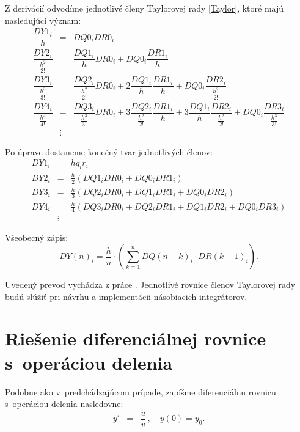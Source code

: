 Z derivácií odvodíme jednotlivé členy Taylorovej rady \eqref{Taylor}, ktoré majú nasledujúci význam:
\begin{eqnarray}
\dfrac{DY1_{i}}{h} & = & DQ0_i DR0_i \\
\dfrac{DY2_{i}}{\frac{h^{2}}{2!}} & = & \dfrac{DQ1_i}{h} DR0_i + DQ0_i \dfrac{DR1_i}{h} \nonumber \\
\dfrac{DY3_{i}}{\frac{h^{3}}{3!}} & = & \dfrac{DQ2_i}{\frac{h^{2}}{2!}} DR0_i + 2 \dfrac{DQ1_i}{h} \dfrac{DR1_i}{h} + DQ0_i \dfrac{DR2_i}{\frac{h^{2}}{2!}} \nonumber \\
\dfrac{DY4_{i}}{\frac{h^{4}}{4!}} & = & \dfrac{DQ3_i}{\frac{h^{3}}{3!}} DR0_i + 3 \dfrac{DQ2_i}{\frac{h^{2}}{2!}} \dfrac{DR1_i}{h} + 3 \dfrac{DQ1_i}{h} \dfrac{DR2_i}{\frac{h^{2}}{2!}} + DQ0_i \dfrac{DR3_i}{\frac{h^{3}}{3!}} \nonumber \\
& \vdots \nonumber & 
\end{eqnarray}



Po úprave dostaneme konečný tvar jednotlivých členov:
\begin{eqnarray}
DY1_{i} & = & hq_{i}r_{i} \label{DY1_cleny_nasobenia} \\
DY2_{i} & = & \frac{h}{2} (DQ1_{i}DR0_{i} + DQ0_{i}DR1_{i}) \label{DY2_cleny_nasobenia} \\
DY3_{i} & = & \frac{h}{3} (DQ2_{i}DR0_{i} + DQ1_{i}DR1_{i} + DQ0_{i}DR2_{i}) \label{DY3_cleny_nasobenia} \\
DY4_{i} & = & \frac{h}{4} (DQ3_{i}DR0_{i} + DQ2_{i}DR1_{i} + DQ1_{i}DR2_{i} + DQ0_{i}DR3_{i}) \label{DY4_cleny_nasobenia} \\
& \vdots \nonumber &
\end{eqnarray}

Všeobecný zápis:
\begin{equation}
DY(n)_{i} = \dfrac{h}{n} \cdot \left( \sum_{k=1}^n DQ(n-k)_{i} \cdot DR(k-1)_{i} \right) . \label{suma_mul}
\end{equation}

Uvedený prevod vychádza z práce \cite{ZavadaBP}. Jednotlivé rovnice členov Taylorovej rady budú slúžiť pri návrhu a implementácii násobiacich integrátorov.


\section{Riešenie diferenciálnej rovnice s~operáciou delenia}
Podobne ako v~predchádzajúcom prípade, zapíšme diferenciálnu rovnicu s~operáciou delenia nasledovne:
\begin{eqnarray}
y' & = & \dfrac{u}{v} \, , \quad y(0) = y_{0} . \label{dif_delenie}
\end{eqnarray}



